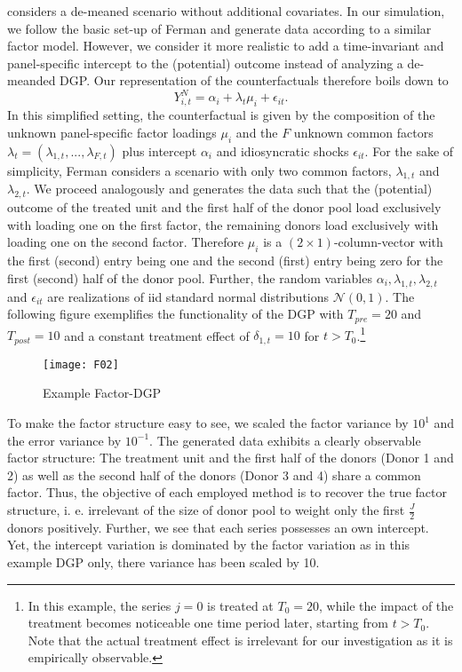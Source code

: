 \cite{ferman:2021} considers a de-meaned scenario without additional covariates. In our simulation, we follow the basic set-up of Ferman and generate data according to a similar factor model. However, we consider it more realistic to add a time-invariant and panel-specific intercept to the (potential) outcome instead of analyzing a de-meanded \ac{DGP}. Our representation of the counterfactuals therefore boils down to 
\begin{equation*}
	Y_{i,t}^{N} = \alpha_i + \lambda_t \mu_i + \epsilon_{it}.
\end{equation*}
In this simplified setting, the counterfactual is given by the composition of the unknown panel-specific factor loadings $\mu_i$ and the $F$ unknown common factors $\lambda_t = (\lambda_{1,t}, ..., \lambda_{F,t})$ plus intercept $\alpha_i$ and idiosyncratic shocks $\epsilon_{it}$. For the sake of simplicity, Ferman considers a scenario with only two common factors, $\lambda_{1,t}$ and $\lambda_{2,t}$. We proceed analogously and generates the data such that the (potential) outcome of the treated unit and the first half of the donor pool load exclusively with loading one on the first factor, the remaining donors load exclusively with loading one on the second factor. Therefore $\mu_i$ is a $(2 \times 1)$-column-vector with the first (second) entry being one and the second (first) entry being zero for the first (second) half of the donor pool. Further, the random variables $\alpha_i, \lambda_{1,t}, \lambda_{2,t}$ and $\epsilon_{it}$ are realizations of \ac{iid} standard normal distributions $\mathcal{N}(0,1)$. The following figure exemplifies the functionality of the \ac{DGP} with $T_{pre} = 20$ and $T_{post} = 10$ and a constant treatment effect of $\delta_{1,t} = 10$ for $t > T_0$.\footnote{In this example, the series $j = 0$ is treated at $T_0 = 20$, while the impact of the treatment becomes noticeable one time period later, starting from $t > T_0$. Note that the actual treatment effect is irrelevant for our investigation as it is empirically observable.}  
\begin{figure}[H]
	\centering
	\texttt{[image: F02]}
	\caption{Example Factor-\ac{DGP}}
	\label{F_02}
\end{figure}
To make the factor structure easy to see, we scaled the factor variance by $10^1$ and the error variance by $10^{-1}$. The generated data exhibits a clearly observable factor structure: The treatment unit and the first half of the donors (Donor 1 and 2) as well as the second half of the donors (Donor 3 and 4) share a common factor. Thus, the objective of each employed method is to recover the true factor structure, i. e. irrelevant of the size of donor pool to weight only the first $\frac{J}{2}$ donors positively. Further, we see that each series possesses an own intercept. Yet, the intercept variation is dominated by the factor variation as in this example \ac{DGP} only, there variance has been scaled by 10.

